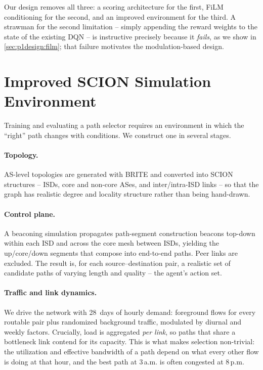 Our design removes all three: a scoring architecture for the first, FiLM conditioning for the second,
and an improved environment for the third. A strawman for the second limitation -- simply appending the
reward weights to the state of the existing DQN -- is instructive precisely because it \emph{fails}, as
we show in \cref{sec:p1design:film}; that failure motivates the modulation-based design.

\section{Improved SCION Simulation Environment}
\label{sec:p1design:env}

Training and evaluating a path selector requires an environment in which the ``right'' path changes
with conditions. We construct one in several stages.

\paragraph{Topology.} AS-level topologies are generated with BRITE and converted into SCION structures
-- ISDs, core and non-core ASes, and inter/intra-ISD links -- so that the graph has realistic degree
and locality structure rather than being hand-drawn.

\paragraph{Control plane.} A beaconing simulation propagates path-segment construction beacons
top-down within each ISD and across the core mesh between ISDs, yielding the up/core/down segments that
compose into end-to-end paths. Peer links are excluded. The result is, for each source--destination
pair, a realistic set of candidate paths of varying length and quality -- the agent's action set.

\paragraph{Traffic and link dynamics.} We drive the network with 28~days of hourly demand: foreground
flows for every routable pair plus randomized background traffic, modulated by diurnal and weekly
factors. Crucially, load is aggregated \emph{per link}, so paths that share a bottleneck link contend
for its capacity. This is what makes selection non-trivial: the utilization and effective bandwidth of
a path depend on what every other flow is doing at that hour, and the best path at 3\,a.m. is often
congested at 8\,p.m.

